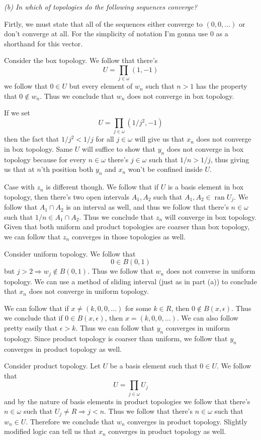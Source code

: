 \documentclass[11pt,oneside,titlepage]{book}
\DeclareMathOperator \ra {\Rightarrow}
\DeclareMathOperator \ran {ran}
\begin{document}
\textit{(b) In which of topologies do the following sequences converge?}

Firtly, we must state that all of the sequences either converge to $(0, 0, ...)$
or don't converge at all. For the simplicity of notation I'm gonna use $0$ as a
shorthand for this vector.

Consider the box topology. We follow that there's
$$U = \prod_{j \in \omega} (1, -1)$$
we follow that $0 \in U$ but every element of $w_n$ such that $n > 1$
has the property that $0 \notin w_n$. Thus we conclude that $w_n$ does
not converge in box topology.

If we set
$$U = \prod_{j \in \omega} (1/j^2, -1)$$
then the fact that $1/j^2 < 1/j$ for all $j \in \omega$ will give us that $x_n$
does not converge in box topology. Same $U$ will suffice to show that $y_n$
does not converge in box topology because for every $n \in \omega$ there's $j \in \omega$
such that $1/n > 1/j$, thus giving us that at $n$'th position both $y_n$ and $x_n$ won't
be confined inside $U$.

Case with $z_n$ is different though. We follow that if $U$ is a basis element in box topology,
then there's two open intervals  $A_1, A_2$ such that $A_1, A_2 \in \ran U_j$.
We follow that $A_1 \cap A_2$ is an interval as well, and thus we follow that there's
$n \in \omega$ such that $1/n \in A_1 \cap A_2$. Thus we conclude that $z_n$ will converge
in box topology. Given that both uniform and product topologies are coarser than box
topology, we can follow that $z_n$ converges in those topologies as well.

Consider uniform topology. We follow that
$$0 \in B(0, 1)$$
but $j > 2 \ra w_j \notin B(0, 1)$. Thus we follow that $w_n$ does not converse in uniform
topology. We can use a method of sliding interval (just as in part (a)) to conclude that
$x_n$ does not converge in uniform topology.

We can follow that if $x \neq (k, 0, 0, ...)$ for some $k \in R$, then $0 \notin B(x, \epsilon)$.
Thus we conclude that if $0 \in B(x, \epsilon)$, then $x = (k, 0, 0, ...)$. We can also
follow pretty easily that $\epsilon > k$. Thus we can follow that $y_n$ converges in uniform
topology. Since product topology is coarser than uniform, we follow that $y_n$ converges
in product topology as well.

Consider product topology. Let $U$ be a basis element such that $0 \in U$. We
follow that
$$U = \prod_{j \in \omega} U_j$$
and by the nature of basis elements in product topologies we follow that there's $n \in \omega$
such that $U_j \neq R \ra j < n$. Thus we follow that there's $n \in \omega$ such that
$w_n \in U$. Therefore we conclude that $w_n$ converges in product topology.
Slightly modified logic can tell us that $x_n$ converges in product topology as well.
\end{document}

